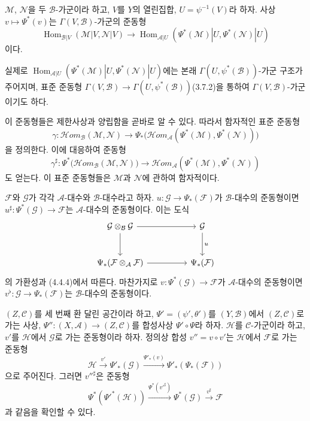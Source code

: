 \begin{env}[4.4.6]
\label{0.4.4.6-ko}
$\mathcal M$, $\mathcal N$을 두 $\mathcal B$-가군이라 하고, $V$를
$Y$의 열린집합, $U=\psi^{-1}(V)$라 하자. 사상
$v\mapsto\Psi^*(v)$는 $\Gamma(V,\mathcal B)$-가군의 준동형
\[
  \operatorname{Hom}_{\mathcal B|V}(\mathcal M|V,\mathcal N|V)
  \longrightarrow
  \operatorname{Hom}_{\mathcal A|U}
  (\Psi^*(\mathcal M)|U,\Psi^*(\mathcal N)|U)
\]
이다.
\begin{sloppypar}
실제로 $\operatorname{Hom}_{\mathcal A|U}
(\Psi^*(\mathcal M)|U,\allowbreak\Psi^*(\mathcal N)|U)$에는 본래
$\Gamma(U,\psi^*(\mathcal B))$-가군 구조가 주어지며, 표준 준동형
$\Gamma(V,\mathcal B)\to\Gamma(U,\psi^*(\mathcal B))$(3.7.2)을 통하여
$\Gamma(V,\mathcal B)$-가군이기도 하다.
\end{sloppypar}
이 준동형들은 제한사상과 양립함을 곧바로 알 수 있다. 따라서
함자적인 표준 준동형
\[
  \gamma:\mathcal H\!om_{\mathcal B}(\mathcal M,\mathcal N)
  \longrightarrow
  \Psi_*\bigl(\mathcal H\!om_{\mathcal A}
  (\Psi^*(\mathcal M),\Psi^*(\mathcal N))\bigr)
\]
을 정의한다. 이에 대응하여 준동형
\[
  \gamma^\sharp:
  \Psi^*\bigl(\mathcal H\!om_{\mathcal B}(\mathcal M,\mathcal N)\bigr)
  \longrightarrow
  \mathcal H\!om_{\mathcal A}
  (\Psi^*(\mathcal M),\Psi^*(\mathcal N))
\]
도 얻는다. 이 표준 준동형들은 $\mathcal M$과 $\mathcal N$에 관하여
함자적이다.
\end{env}

\begin{env}[4.4.7]
\label{0.4.4.7-ko}
$\mathcal F$와 $\mathcal G$가 각각 $\mathcal A$-대수와
$\mathcal B$-대수라고 하자. $u:\mathcal G\to\Psi_*(\mathcal F)$가
$\mathcal B$-대수의 준동형이면
$u^\sharp:\Psi^*(\mathcal G)\to\mathcal F$는 $\mathcal A$-대수의
준동형이다. 이는 도식
\[
\begin{tikzcd}[column sep=huge,row sep=large]
\mathcal G\otimes_{\mathcal B}\mathcal G
  \arrow[r] \arrow[d]
  & \mathcal G \arrow[d,"u"] \\
\Psi_*(\mathcal F\otimes_{\mathcal A}\mathcal F)
  \arrow[r]
  & \Psi_*(\mathcal F)
\end{tikzcd}
\]
의 가환성과 (4.4.4)에서 따른다. 마찬가지로
$v:\Psi^*(\mathcal G)\to\mathcal F$가 $\mathcal A$-대수의 준동형이면
$v^\flat:\mathcal G\to\Psi_*(\mathcal F)$는 $\mathcal B$-대수의
준동형이다.
\end{env}

\begin{env}[4.4.8]
\label{0.4.4.8-ko}
$(Z,\mathcal C)$를 세 번째 환 달린 공간이라 하고,
$\Psi'=(\psi',\theta')$를 $(Y,\mathcal B)$에서 $(Z,\mathcal C)$로 가는
사상, $\Psi'':(X,\mathcal A)\to(Z,\mathcal C)$를 합성사상
$\Psi'\circ\Psi$라 하자. $\mathcal H$를 $\mathcal C$-가군이라 하고,
$v'$를 $\mathcal H$에서 $\mathcal G$로 가는 준동형이라 하자. 정의상
합성 $v''=v\circ v'$는 $\mathcal H$에서 $\mathcal F$로 가는 준동형
\[
  \mathcal H\xrightarrow{v'}\Psi'_*(\mathcal G)
  \xrightarrow{\Psi'_*(v)}\Psi'_*(\Psi_*(\mathcal F))
\]
으로 주어진다. 그러면 ${v''}^\sharp$은 준동형
\[
  \Psi^*({\Psi'}^*(\mathcal H))
  \xrightarrow{\Psi^*({v'}^\sharp)}
  \Psi^*(\mathcal G)
  \xrightarrow{v^\sharp}\mathcal F
\]
과 같음을 확인할 수 있다.
\end{env}

